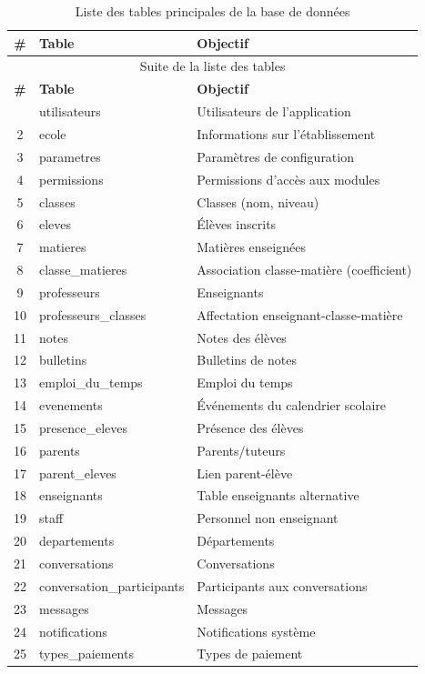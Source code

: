 \documentclass[12pt,a4paper,twoside]{report}
\begin{document}
\begin{longtable}{cll}
\caption{Liste des tables principales de la base de données}\\
\toprule
\textbf{\#} & \textbf{Table} & \textbf{Objectif} \\
\midrule
\endfirsthead
\multicolumn{3}{c}{Suite de la liste des tables}\\
\toprule
\textbf{\#} & \textbf{Table} & \textbf{Objectif} \\
\midrule
\endhead
\bottomrule
\endfoot
1 & utilisateurs & Utilisateurs de l'application \\
2 & ecole & Informations sur l'établissement \\
3 & parametres & Paramètres de configuration \\
4 & permissions & Permissions d'accès aux modules \\
5 & classes & Classes (nom, niveau) \\
6 & eleves & Élèves inscrits \\
7 & matieres & Matières enseignées \\
8 & classe\_matieres & Association classe-matière (coefficient) \\
9 & professeurs & Enseignants \\
10 & professeurs\_classes & Affectation enseignant-classe-matière \\
11 & notes & Notes des élèves \\
12 & bulletins & Bulletins de notes \\
13 & emploi\_du\_temps & Emploi du temps \\
14 & evenements & Événements du calendrier scolaire \\
15 & presence\_eleves & Présence des élèves \\
16 & parents & Parents/tuteurs \\
17 & parent\_eleves & Lien parent-élève \\
18 & enseignants & Table enseignants alternative \\
19 & staff & Personnel non enseignant \\
20 & departements & Départements \\
21 & conversations & Conversations \\
22 & conversation\_participants & Participants aux conversations \\
23 & messages & Messages \\
24 & notifications & Notifications système \\
25 & types\_paiements & Types de paiement \\

\end{longtable}
\end{document}
